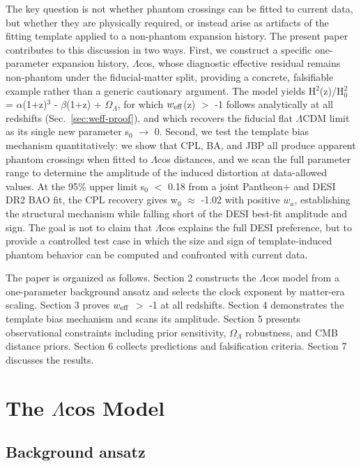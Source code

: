 The key question is not whether phantom crossings can be fitted to
current data, but whether they are physically required, or instead arise
as artifacts of the fitting template applied to a non-phantom expansion
history. The present paper contributes to this discussion in two ways.
First, we construct a specific one-parameter expansion history, $\Lambda$cos,
whose diagnostic effective residual remains non-phantom under the
fiducial-matter split, providing a concrete, falsifiable example rather
than a generic cautionary argument. The model yields H$^2$(z)/H$_0^2$ = $\alpha$(1+z)$^3$
- $\beta$(1+z) + $\Omega_\Lambda$, for which $w_{\rm eff}$(z) $>$ -1 follows
analytically at all redshifts (Sec.~\ref{sec:weff-proof}), and which recovers the fiducial flat
$\Lambda$CDM limit as its single new parameter s$_0$ $\to$ 0. Second, we test the
template bias mechanism quantitatively: we show that CPL, BA, and JBP
all produce apparent phantom crossings when fitted to $\Lambda$cos distances,
and we scan the full parameter range to determine the amplitude of the
induced distortion at data-allowed values. At the 95\% upper limit s$_0$
$<$ 0.18 from a joint Pantheon+ and DESI DR2 BAO fit, the CPL
recovery gives w$_0$ $\approx$ -1.02 with positive $w_a$, establishing the
structural mechanism while falling short of the DESI best-fit amplitude
and sign. The goal is not to claim that $\Lambda$cos explains the full DESI
preference, but to provide a controlled test case in which the size and
sign of template-induced phantom behavior can be computed and confronted
with current data.

The paper is organized as follows. Section 2 constructs the $\Lambda$cos model
from a one-parameter background ansatz and selects the clock exponent by
matter-era scaling. Section 3 proves $w_{\rm eff}$ $>$ -1 at all
redshifts. Section 4 demonstrates the template bias mechanism and scans
its amplitude. Section 5 presents observational constraints including
prior sensitivity, $\Omega_\Lambda$ robustness, and CMB distance priors. Section 6
collects predictions and falsification criteria. Section 7 discusses the
results.

\section{The $\Lambda$cos Model}\label{sec:lcos-model}

\subsection{Background ansatz}\label{sec:ansatz}

